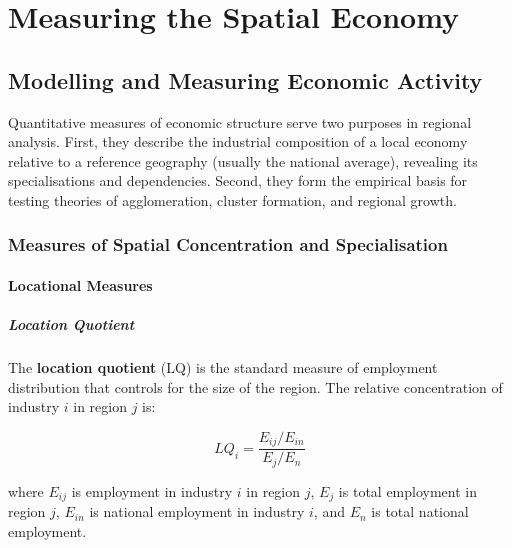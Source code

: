 
\chapter{Measuring the Spatial Economy}
\label{chap_EconAnalysis}

\section{Modelling and Measuring Economic Activity}
\label{sec_EconActivity}

Quantitative measures of economic structure serve two purposes in regional
analysis. First, they describe the industrial composition of a local economy
relative to a reference geography (usually the national average), revealing
its specialisations and dependencies. Second, they form the empirical basis
for testing theories of agglomeration, cluster formation, and regional growth.

\subsection{Measures of Spatial Concentration and Specialisation}

\subsubsection{Locational Measures}

\paragraph{Location Quotient}

The \textbf{location quotient} (LQ) is the standard measure of employment
distribution that controls for the size of the region. The relative
concentration of industry $i$ in region $j$ is:

\begin{tcolorbox}[keyresult]
\begin{equation}
  LQ_i = \frac{E_{ij}/E_{in}}{E_j/E_n}
  \label{eq_LQ}
\end{equation}
\end{tcolorbox}

\noindent where $E_{ij}$ is employment in industry $i$ in region $j$,
$E_j$ is total employment in region $j$, $E_{in}$ is national employment
in industry $i$, and $E_n$ is total national employment.

